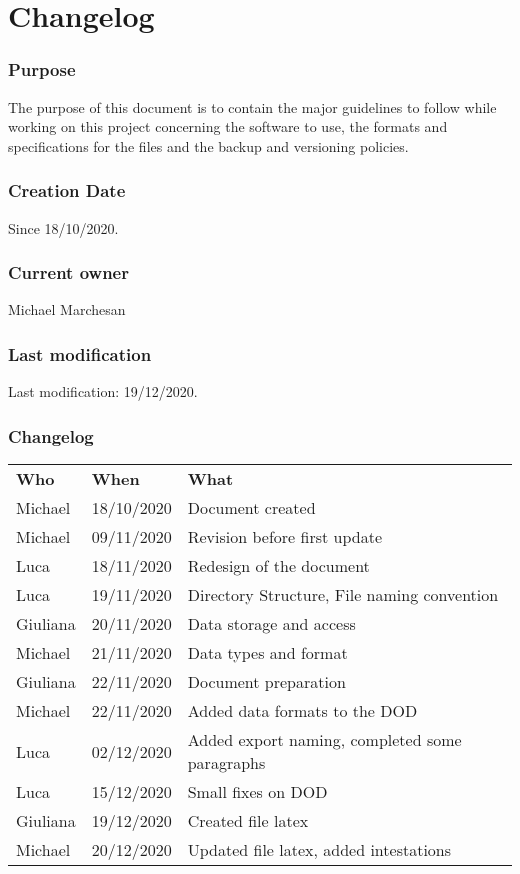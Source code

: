 \section*{Changelog}

\subsubsection*{Purpose}
The purpose of this document is to contain the major guidelines to follow while working on this project concerning the software to use, the formats and specifications for the files and the backup and versioning policies.

\subsubsection*{Creation Date}
Since 18/10/2020.\\

\subsubsection*{Current owner}
Michael Marchesan

\subsubsection*{Last modification}
Last modification: 19/12/2020.

\subsubsection*{Changelog}
\begin{longtable}{ m{2cm}m{3cm}m{8cm}} 
\centering 
 \textbf{Who}& \textbf{When} & \textbf{What}\\
Michael  & 18/10/2020 & Document created \\
Michael  & 09/11/2020 & Revision before first update \\
Luca     & 18/11/2020 & Redesign of the document \\
Luca     & 19/11/2020 & Directory Structure, File naming convention \\
Giuliana & 20/11/2020 & Data storage and access \\
Michael  & 21/11/2020 & Data types and format  \\
Giuliana & 22/11/2020 & Document preparation \\
Michael  & 22/11/2020 & Added data formats to the DOD \\
Luca     & 02/12/2020 & Added export naming, completed some paragraphs \\
Luca     & 15/12/2020 & Small fixes on DOD\\
Giuliana & 19/12/2020 & Created file latex \\
Michael  & 20/12/2020 & Updated file latex, added intestations \\

\end{longtable}

\pagebreak
